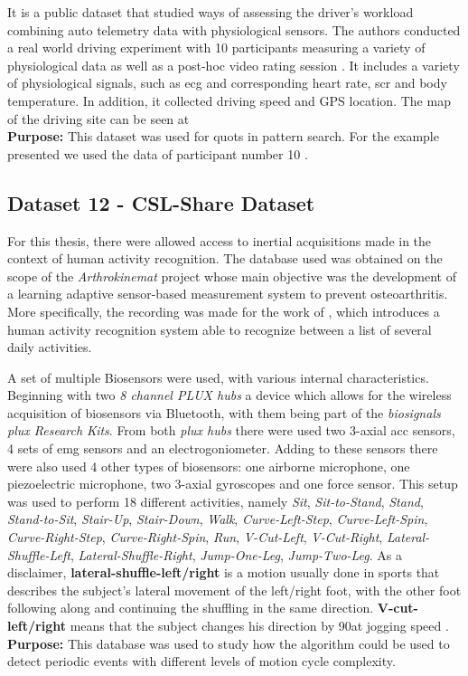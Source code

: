 It is a public dataset that studied ways of assessing the driver's workload combining auto telemetry data with physiological sensors. The authors conducted a real world driving experiment with 10 participants measuring a variety of physiological data as well as a post-hoc video rating session \cite{hcilab}. It includes a variety of physiological signals, such as \gls{ecg} and corresponding heart rate, \gls{scr} and body temperature. In addition, it collected driving speed and GPS location. The map of the driving site can be seen at \cite{hcilab}\\
\textbf{Purpose:} This dataset was used for \gls{quots} in pattern search. For the example presented we used the data of participant number 10 \cite{hcilab}.

\subsection{Dataset 12 - CSL-Share Dataset}

For this thesis, there were allowed access to inertial acquisitions made in the context of human activity recognition. The database used was obtained on the scope of the \textit{Arthrokinemat} project whose main objective was the development of a learning adaptive sensor-based measurement system to prevent osteoarthritis\cite{arthrokinemat}. More specifically, the recording was made for the work of \cite{Liu2019}, which introduces a human activity recognition system able to recognize between a list of several daily activities.
\par
A set of multiple Biosensors were used, with various internal characteristics. Beginning with two \textit{8 channel PLUX hubs} a device which allows for the wireless acquisition of biosensors via Bluetooth, with them being part of the \textit{biosignals plux Research Kits}. From both \textit{plux hubs} there were used two 3-axial \gls{acc} sensors, 4 sets of \gls{emg} sensors and an electrogoniometer. Adding to these sensors there were also used 4 other types of biosensors: one airborne microphone, one piezoelectric microphone, two 3-axial gyroscopes and one force sensor. This setup was used to perform 18 different activities, namely \textit{Sit}, \textit{Sit-to-Stand}, \textit{Stand}, \textit{Stand-to-Sit}, \textit{Stair-Up}, \textit{Stair-Down}, \textit{Walk}, \textit{Curve-Left-Step}, \textit{Curve-Left-Spin}, \textit{Curve-Right-Step}, \textit{Curve-Right-Spin}, \textit{Run}, \textit{V-Cut-Left}, \textit{V-Cut-Right}, \textit{Lateral-Shuffle-Left}, \textit{Lateral-Shuffle-Right}, \textit{Jump-One-Leg}, \textit{Jump-Two-Leg}. As a disclaimer, \textbf{lateral-shuffle-left/right} is a motion usually done in sports that describes the subject's lateral movement of the left/right foot, with the other foot following along and continuing the shuffling in the same direction. \textbf{V-cut-left/right} means that the subject changes his direction by 90\degree at jogging speed \cite{dataset_hui}.\\
\textbf{Purpose:} This database was used to study how the algorithm could be used to detect periodic events with different levels of motion cycle complexity.



